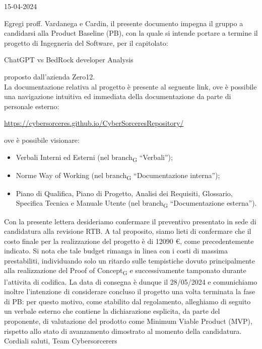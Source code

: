 \documentclass{article}
\begin{document}
\begin{flushright}
15-04-2024
\end{flushright}
Egregi proff. Vardanega e Cardin,
\newline
il presente documento impegna il gruppo a candidarsi alla Product Baseline (PB), con la quale si intende portare a termine il progetto di Ingegneria del Software, per il
capitolato:
\newline
\begin{center}
    ChatGPT vs BedRock developer Analysis
\end{center}
proposto dall’azienda Zero12. \\La documentazione relativa al progetto è presente al seguente link, ove è possibile una navigazione intuitiva ed immediata della documentazione da parte di personale esterno:
\begin{center}
    \href{https://cybersorceres.github.io/CyberSorceresRepository/}{https://cybersorceres.github.io/CyberSorceresRepository/}
\end{center}
ove è possibile visionare:
\begin{itemize}
    \item Verbali Interni ed Esterni (nel branch\textsubscript{G} “Verbali”);
    \item Norme Way of Working (nel branch\textsubscript{G} “Documentazione interna”);
    \item Piano di Qualifica, Piano di Progetto, Analisi dei Requisiti, Glossario, Specifica Tecnica e Manuale Utente (nel branch\textsubscript{G} “Documentazione esterna”).
\end{itemize}

Con la presente lettera desideriamo confermare il preventivo presentato in sede di candidatura alla revisione RTB. A tal proposito, siamo lieti di confermare che il costo finale per la realizzazione del progetto è di 12090 €, come precedentemente indicato. Si nota che tale budget rimanga in linea con i costi di massima prestabiliti, individuando solo un ritardo sulle tempistiche dovuto principalmente alla realizzazione del Proof of Concept\textsubscript{G} e successivamente tamponato durante l'attivita di codifica. La data di consegna è dunque il 28/05/2024 e comunichiamo inoltre l’intenzione di considerare concluso il progetto una volta terminata la fase di PB: per questo motivo, come stabilito dal regolamento, alleghiamo di seguito un verbale esterno che
contiene la dichiarazione esplicita, da parte del proponente, di valutazione del prodotto come Minimum Viable Product (MVP), rispetto allo stato di avanzamento dimostrato al momento della candidatura. 
\newline
\newline
Cordiali saluti,
\newline
Team Cybersorcerers
\end{document}
